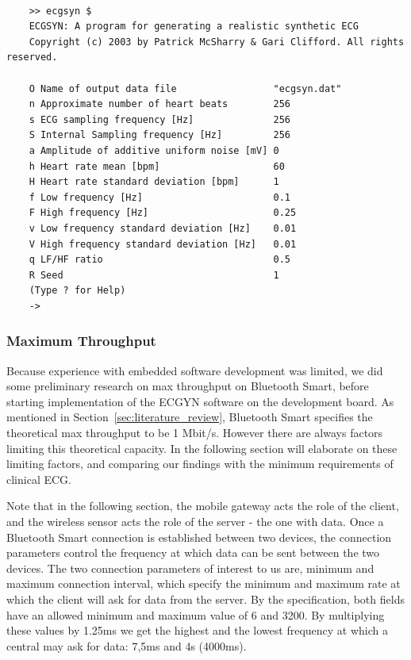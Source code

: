 \begin{lstlisting}[caption={ECGSYN Commando Line Interface (CLI)}, label={lst:ecgsyn_terminal}, basicstyle=\tiny]

    >> ecgsyn $
    ECGSYN: A program for generating a realistic synthetic ECG
    Copyright (c) 2003 by Patrick McSharry & Gari Clifford. All rights reserved.
     
    O Name of output data file                 "ecgsyn.dat"
    n Approximate number of heart beats        256
    s ECG sampling frequency [Hz]              256
    S Internal Sampling frequency [Hz]         256
    a Amplitude of additive uniform noise [mV] 0
    h Heart rate mean [bpm]                    60
    H Heart rate standard deviation [bpm]      1
    f Low frequency [Hz]                       0.1
    F High frequency [Hz]                      0.25
    v Low frequency standard deviation [Hz]    0.01
    V High frequency standard deviation [Hz]   0.01
    q LF/HF ratio                              0.5
    R Seed                                     1
    (Type ? for Help)
    ->

\end{lstlisting}

\subsubsection{Maximum Throughput} %
\label{ssub:maximum_throughput}

Because experience with embedded software development was limited, we did some preliminary research on max throughput on Bluetooth Smart, before starting implementation of the ECGYN software on the development board. As mentioned in Section~\ref{sec:literature_review}, Bluetooth Smart specifies the theoretical max throughput to be 1 Mbit/s. However there are always factors limiting this theoretical capacity. In the following section will elaborate on these limiting factors, and comparing our findings with the minimum requirements of clinical ECG.

Note that in the following section, the mobile gateway acts the role of the client, and the wireless sensor acts the role of the server - the one with data. Once a Bluetooth Smart connection is established between two devices, the connection parameters \cite{newRef:59} control the frequency at which data can be sent between the two devices. The two connection parameters of interest to us are, minimum and maximum connection interval, which specify the minimum and maximum rate at which the client will ask for data from the server. By the specification, both fields have an allowed minimum and maximum value of 6 and 3200. By multiplying these values by 1.25ms we get the highest and the lowest frequency at which a central may ask for data: 7,5ms and 4s (4000ms).


